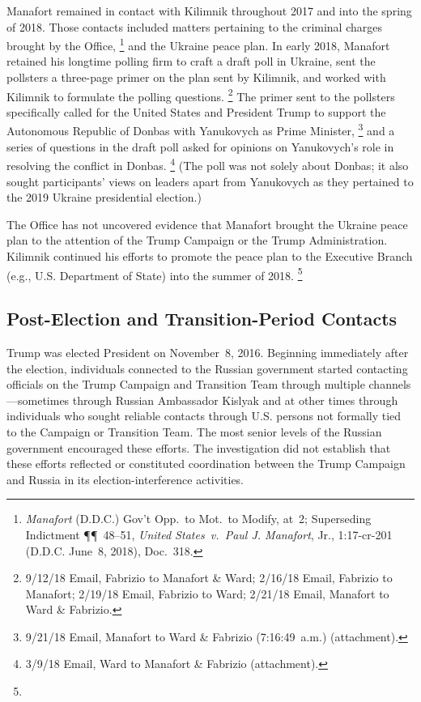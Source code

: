 Manafort remained in contact with Kilimnik throughout 2017 and into the spring of 2018.
Those contacts included matters pertaining to the criminal charges brought by the Office,%
\footnote{\textit{Manafort} (D.D.C.) Gov't Opp.\ to Mot.\ to Modify, at~2;
Superseding Indictment \P\P~48--51, \textit{United States~v.\ Paul J. Manafort}, Jr., 1:17-cr-201 (D.D.C. June~8, 2018), Doc.~318.}
and the Ukraine peace plan.
In early 2018, Manafort retained his longtime polling firm to craft a draft poll in Ukraine, sent the pollsters a three-page primer on the plan sent by Kilimnik, and worked with Kilimnik to formulate the polling questions.%
\footnote{9/12/18 Email, Fabrizio to Manafort \& Ward;
2/16/18 Email, Fabrizio to Manafort;
2/19/18 Email, Fabrizio to Ward;
2/21/18 Email, Manafort to Ward \& Fabrizio.}
The primer sent to the pollsters specifically called for the United States and President Trump to support the Autonomous Republic of Donbas with Yanukovych as Prime Minister,%
\footnote{9/21/18 Email, Manafort to Ward \& Fabrizio (7:16:49~a.m.) (attachment).}
and a series of questions in the draft poll asked for opinions on Yanukovych's role in resolving the conflict in Donbas.%
\footnote{3/9/18 Email, Ward to Manafort \& Fabrizio (attachment).}
(The poll was not solely about Donbas; it also sought participants' views on leaders apart from Yanukovych as they pertained to the 2019 Ukraine presidential election.)

The Office has not uncovered evidence that Manafort brought the Ukraine peace plan to the attention of the Trump Campaign or the Trump Administration.
Kilimnik continued his efforts to promote the peace plan to the Executive Branch (e.g., U.S. Department of State) into the summer of 2018.%
\footnote{}

\subsection{Post-Election and Transition-Period Contacts}

Trump was elected President on November~8, 2016.
Beginning immediately after the election, individuals connected to the Russian government started contacting officials on the Trump Campaign and Transition Team through multiple channels---sometimes through Russian Ambassador Kislyak and at other times through individuals who sought reliable contacts through U.S. persons not formally tied to the Campaign or Transition Team.
The most senior levels of the Russian government encouraged these efforts.
The investigation did not establish that these efforts reflected or constituted coordination between the Trump Campaign and Russia in its election-interference activities.

